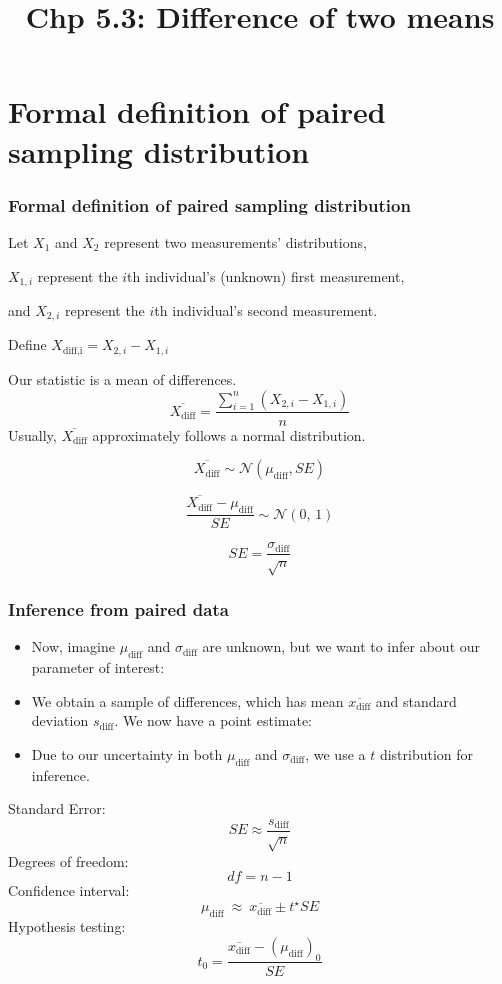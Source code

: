 \documentclass[11pt,containsverbatim,handout]{beamer}
\title[Chp 5.3: Difference of two means]{Chp 5.3: Difference of two means}
\newcommand{\soln}[1]{ }
\begin{document}
\section{Formal definition of paired sampling distribution}
\begin{frame}
\frametitle{Formal definition of paired sampling distribution}
\small
Let $X_1$ and $X_2$ represent two measurements' distributions,\pause

$X_{1,i}$ represent the $i$th individual's (unknown) first measurement,\pause

and $X_{2,i}$ represent the $i$th individual's second measurement. \pause

Define $X_\text{diff,i} = X_{2,i}-X_{1,i}$\pause

Our statistic is a mean of differences.\pause
$$\overline{X_\text{diff}} = \frac{\sum\limits_{i=1}^n (X_{2,i}-X_{1,i})}{n}$$\pause
Usually, $\overline{X_\text{diff}}$ approximately follows a normal distribution.\pause

$$ \overline{X_\text{diff}} \sim \mathcal{N}(\mu_\text{diff}, SE)$$\pause

$$ \frac{\overline{X_\text{diff}} - \mu_\text{diff}}{SE} \sim \mathcal{N}(0,\, 1)$$\pause

$$SE = \frac{\sigma_\text{diff}}{\sqrt{n}} $$
\end{frame}


\begin{frame}
\frametitle{Inference from paired data}
\begin{itemize}
\item Now, imagine $\mu_\text{diff}$ and $\sigma_\text{diff}$ are unknown, but we want to infer about our parameter of interest: \pause \soln{$\mu_\text{diff}$}
\pause
\item We obtain a sample of differences, which has mean $\overline{x_{\text{diff}}}$ and standard deviation $s_\text{diff}$. We now have a point estimate: \pause \soln{$\overline{x_{\text{diff}}}$} 
\pause 
\item Due to our uncertainty in both $\mu_\text{diff}$ and $\sigma_\text{diff}$, we use a $t$ distribution for inference. 
\pause
\end{itemize}
\vspace{10pt}

\noindent Standard Error: \pause
$$SE \approx \frac{s_{\text{diff}}}{\sqrt{n}}$$ \pause
Degrees of freedom:\pause
$$df = n-1 $$\pause
Confidence interval:\pause
$$\mu_\text{diff} ~\approx~ \overline{x_{\text{diff}}} \pm t^\star SE $$ \pause
Hypothesis testing:\pause
$$t_0 = \frac{\overline{x_{\text{diff}}}-(\mu_{\text{diff}})_0}{SE} $$
\end{frame}
\end{document}
